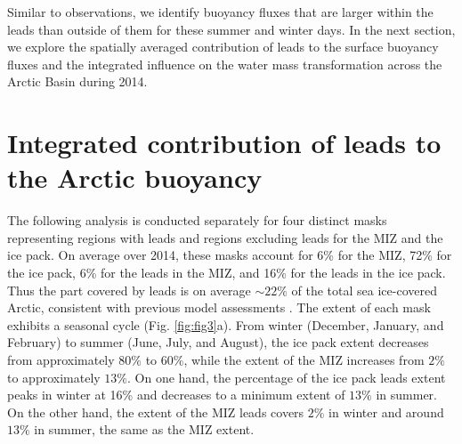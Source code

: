 \documentclass[draft]{agujournal2019}
\begin{document}
Similar to observations, we identify buoyancy fluxes that are larger within the leads than outside of them for these summer and winter days. In the next section, we explore the spatially averaged contribution of leads to the surface buoyancy fluxes and the integrated influence on the water mass transformation across the Arctic Basin during 2014. 

\section{Integrated contribution of leads to the Arctic buoyancy}\label{sec3}

The following analysis is conducted separately for four distinct masks representing regions with leads and regions excluding leads for the MIZ and the ice pack. On average over 2014, these masks account for 6\% for the MIZ, 72\% for the ice pack, 6\% for the leads in the MIZ, and 16\% for the leads in the ice pack. Thus the part covered by leads is on average $\sim 22\%$ of the total sea ice-covered Arctic, consistent with previous model assessments \cite{Wang_leads_2016}. 
The extent of each mask exhibits a seasonal cycle (Fig. \ref{fig:fig3}a). From winter (December, January, and February) to  summer (June, July, and August), the ice pack extent decreases from approximately $80\%$ to $60\%$, while the extent of the MIZ increases from $2\%$ to approximately $13\%$. 
On one hand, the percentage of the ice pack leads extent peaks in winter at 16\% and decreases to a minimum extent of $13\%$ in summer. On the other hand, the extent of the MIZ leads covers $2\%$ in winter and around $13\%$ in summer, the same as the MIZ extent. 
\end{document}
